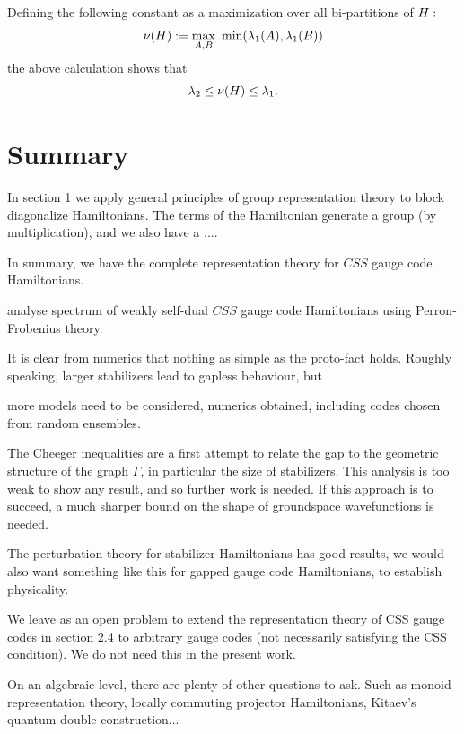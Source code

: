 Defining the following constant as a maximization over
all bi-partitions of $H:$
$$
    \nu(\Ham) := \max_{A, B}\ \mbox{min}(\lambda_1(A), \lambda_1(B))
$$
the above calculation shows that
$$
    \lambda_2 \le \nu(H) \le \lambda_1.
$$


\section{Summary}


In section 1 we apply general principles of group
representation theory to block diagonalize Hamiltonians.
The terms of the Hamiltonian generate a group (by multiplication),
and we also have a ....

In summary, we have the complete representation
theory for $CSS$ gauge code Hamiltonians.

analyse spectrum of weakly self-dual $CSS$ gauge code
Hamiltonians using Perron-Frobenius theory.

It is clear from numerics that nothing as simple as the proto-fact
holds. Roughly speaking, larger stabilizers lead to gapless behaviour,
but 

more models need to be considered,  numerics obtained,
including codes chosen from random ensembles.

The Cheeger inequalities are a first attempt to
relate the gap to the geometric structure of the
graph $\Gamma$, in particular the size of stabilizers.
This analysis is too weak to show any result, and so
further work is needed.
If this approach is to succeed, a much sharper
bound on the shape of groundspace wavefunctions is needed.

The perturbation theory for stabilizer Hamiltonians has good
results, we would also want something like this for gapped
gauge code Hamiltonians, to establish physicality.

We leave as an open problem 
to extend the representation theory of
CSS gauge codes in section 2.4 to arbitrary gauge codes
(not necessarily satisfying the CSS condition).
We do not need this in the present work.

On an algebraic level, there are plenty of other questions
to ask. Such as monoid representation theory, locally commuting
projector Hamiltonians, Kitaev's quantum double construction...


